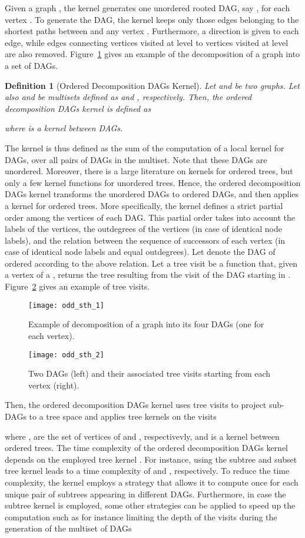 \documentclass[twoside,11pt]{article}
\newtheorem{definition}{Definition}
\begin{document}
Given a graph , the kernel generates one unordered rooted DAG, say , for each vertex .
To generate the DAG, the kernel keeps only those edges belonging to the shortest paths between  and any vertex .
Furthermore, a direction is given to each edge, while edges connecting vertices visited at level  to vertices visited at level  are also removed.
Figure~\ref{fig:odd_1} gives an example of the decomposition of a graph into a set of DAGs.
\begin{definition}[Ordered Decomposition DAGs Kernel]
  Let  and  be two graphs.
  Let also  and  be multisets defined as  and , respectively.
  Then, the ordered decomposition DAGs kernel is defined as
  
  where  is a kernel between DAGs.
\end{definition}
The kernel is thus defined as the sum of the computation of a local kernel for DAGs, over all pairs of DAGs in the multiset. 
Note that these DAGs are unordered.
Moreover, there is a large literature on kernels for ordered trees, but only a few kernel functions for unordered trees.
Hence, the ordered decomposition DAGs kernel transforms the unordered DAGs to ordered DAGs, and then applies a kernel for ordered trees.
More specifically, the kernel defines a strict partial order among the vertices of each DAG.
This partial order takes into account the labels of the vertices, the outdegrees of the vertices (in case of identical node labels), and the relation between the sequence of successors of each vertex (in case of identical node labels and equal outdegrees).
Let  denote the DAG of  ordered according to the above relation.
Let a tree visit be a function  that, given a vertex  of a , returns the tree resulting from the visit of the DAG starting in .
Figure~\ref{fig:odd_2} gives an example of tree visits.
\begin{figure}[t]
  \centering
  \texttt{[image: odd\_sth\_1]}
  \caption{Example of decomposition of a graph into its four DAGs (one for each vertex).}
  \label{fig:odd_1}
\end{figure}
\begin{figure}[t]
  \centering
  \texttt{[image: odd\_sth\_2]}
  \caption{Two DAGs (left) and their associated tree visits  starting from each vertex  (right).}
  \label{fig:odd_2}
\end{figure}
Then, the ordered decomposition DAGs kernel uses tree visits to project sub-DAGs to a tree space and applies tree kernels on the visits

where ,  are the set of vertices of  and , respectivevly, and  is a kernel between ordered trees.
The time complexity of the ordered decomposition DAGs kernel depends on the employed tree kernel .
For instance, using the subtree and subset tree kernel leads to a time complexity of  and , respectively.
To reduce the time complexity, the kernel employs a strategy that allows it to compute  once for each unique pair of subtrees appearing in different DAGs.
Furthermore, in case the subtree kernel is employed, some other strategies can be applied to speed up the computation such as for instance limiting the depth of the visits during the generation of the multiset of DAGs 
\end{document}
